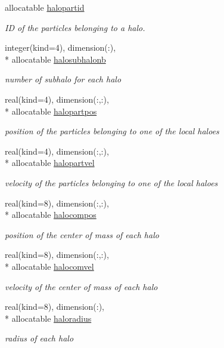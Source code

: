 \begin{DoxyCompactItemize}
allocatable \hyperlink{classmodhalo_a6c47abc5102dc629247c7b90831b1030}{halopartid}
\begin{DoxyCompactList}\small\item\em I\-D of the particles belonging to a halo. \end{DoxyCompactList}\item 
integer(kind=4), dimension(\-:), \\*
allocatable \hyperlink{classmodhalo_a5047e50f3939eaf91496eb430ea12952}{halosubhalonb}
\begin{DoxyCompactList}\small\item\em number of subhalo for each halo \end{DoxyCompactList}\item 
real(kind=4), dimension(\-:,\-:), \\*
allocatable \hyperlink{classmodhalo_a935d49a97e72fe931ab0e2cee84d1523}{halopartpos}
\begin{DoxyCompactList}\small\item\em position of the particles belonging to one of the local haloes \end{DoxyCompactList}\item 
real(kind=4), dimension(\-:,\-:), \\*
allocatable \hyperlink{classmodhalo_a9d88ee4555aab3eb3cc4626800de250b}{halopartvel}
\begin{DoxyCompactList}\small\item\em velocity of the particles belonging to one of the local haloes \end{DoxyCompactList}\item 
real(kind=8), dimension(\-:,\-:), \\*
allocatable \hyperlink{classmodhalo_a872c41ce5ed017bb6f443156dd18d0af}{halocompos}
\begin{DoxyCompactList}\small\item\em position of the center of mass of each halo \end{DoxyCompactList}\item 
real(kind=8), dimension(\-:,\-:), \\*
allocatable \hyperlink{classmodhalo_ad9aa6bd557e4766c0d1d612e203a1e67}{halocomvel}
\begin{DoxyCompactList}\small\item\em velocity of the center of mass of each halo \end{DoxyCompactList}\item 
real(kind=8), dimension(\-:), \\*
allocatable \hyperlink{classmodhalo_ac245616b2bd1db72ab7891e811f668de}{haloradius}
\begin{DoxyCompactList}\small\item\em radius of each halo \end{DoxyCompactList}\end{DoxyCompactItemize}


